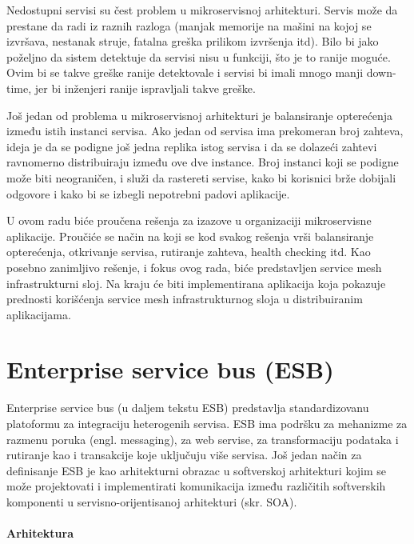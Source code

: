 \documentclass[a4paper,12pt]{report}
\begin{document}
Nedostupni servisi su čest problem u mikroservisnoj arhitekturi. Servis može da prestane da radi iz raznih razloga (manjak memorije na mašini na kojoj se izvršava, nestanak struje, fatalna greška prilikom izvršenja itd). Bilo bi jako poželjno da sistem detektuje da servisi nisu u funkciji, što je to ranije moguće. Ovim bi se takve greške ranije detektovale i servisi bi imali mnogo manji down-time, jer bi inženjeri ranije ispravljali takve greške. \newline

Još jedan od problema u mikroservisnoj arhitekturi je balansiranje opterećenja između istih instanci servisa. Ako jedan od servisa ima prekomeran broj zahteva, ideja je da se podigne još jedna replika istog servisa i da se dolazeći zahtevi ravnomerno distribuiraju između ove dve instance. Broj instanci koji se podigne može biti neograničen, i služi da rastereti servise, kako bi korisnici brže dobijali odgovore i kako bi se izbegli nepotrebni padovi aplikacije. \newline 

U ovom radu biće proučena rešenja za izazove u organizaciji mikroservisne aplikacije. Proučiće se način na koji se kod svakog rešenja vrši balansiranje opterećenja, otkrivanje servisa, rutiranje zahteva, health checking itd. Kao posebno zanimljivo rešenje, i fokus ovog rada, biće predstavljen service mesh infrastrukturni sloj. Na kraju će biti implementirana aplikacija koja pokazuje prednosti korišćenja service mesh infrastrukturnog sloja u distribuiranim aplikacijama. \newline 

\chapter{Enterprise service bus (ESB)}

Enterprise service bus (u daljem tekstu ESB) predstavlja standardizovanu platoformu za integraciju heterogenih servisa. ESB ima podršku za mehanizme za razmenu poruka (engl. messaging), za web servise, za transformaciju podataka i rutiranje kao i transakcije koje uključuju više servisa. Još jedan način za definisanje ESB je kao arhitekturni obrazac u softverskoj arhitekturi kojim se može projektovati i implementirati komunikacija između različitih softverskih komponenti u servisno-orijentisanoj arhitekturi (skr. SOA).\newline

\subsubsection{Arhitektura}
\end{document}
